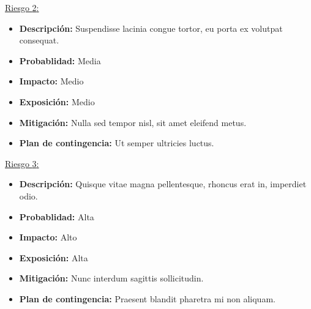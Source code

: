 \documentclass[a4paper, 10pt, twoside]{article}
\newcommand{\riesgo}[7]{
  \underline{Riesgo {#1}:}
  \begin{itemize}   
    \item \textbf{Descripción:} {#2}
    \item \textbf{Probablidad:} {#3}
    \item \textbf{Impacto:} {#4}
    \item \textbf{Exposición:} {#5}
    \item \textbf{Mitigación:} {#6}
    \item \textbf{Plan de contingencia:} {#7}
  \end{itemize}
}
\begin{document}
\riesgo{2}
    {Suspendisse lacinia congue tortor, eu porta ex volutpat consequat.}
    {Media}
    {Medio}
    {Medio}
    {Nulla sed tempor nisl, sit amet eleifend metus.}
    {Ut semper ultricies luctus.}

\riesgo{3}
    {Quisque vitae magna pellentesque, rhoncus erat in, imperdiet odio.}
    {Alta}
    {Alto}
    {Alta}
    {Nunc interdum sagittis sollicitudin.}
    {Praesent blandit pharetra mi non aliquam.}

\newpage
\end{document}
